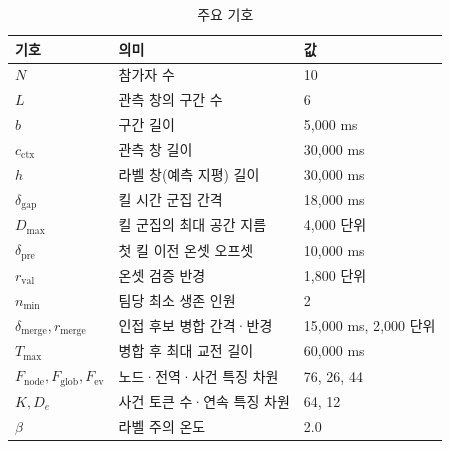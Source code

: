 \begin{table}[H]
  \centering
  \caption{주요 기호}
  \label{tab:notation}
  \small
  \begin{tabular}{@{}lll@{}}
    \toprule
    기호 & 의미 & 값 \\
    \midrule
    $N$ & 참가자 수 & 10 \\
    $L$ & 관측 창의 구간 수 & 6 \\
    $b$ & 구간 길이 & 5{,}000 ms \\
    $c_{\mathrm{ctx}}$ & 관측 창 길이 & 30{,}000 ms \\
    $h$ & 라벨 창(예측 지평) 길이 & 30{,}000 ms \\
    $\delta_{\mathrm{gap}}$ & 킬 시간 군집 간격 & 18{,}000 ms \\
    $D_{\max}$ & 킬 군집의 최대 공간 지름 & 4{,}000 단위 \\
    $\delta_{\mathrm{pre}}$ & 첫 킬 이전 온셋 오프셋 & 10{,}000 ms \\
    $r_{\mathrm{val}}$ & 온셋 검증 반경 & 1{,}800 단위 \\
    $n_{\min}$ & 팀당 최소 생존 인원 & 2 \\
    $\delta_{\mathrm{merge}}, r_{\mathrm{merge}}$ & 인접 후보 병합 간격·반경 & 15{,}000 ms, 2{,}000 단위 \\
    $T_{\max}$ & 병합 후 최대 교전 길이 & 60{,}000 ms \\
    $F_{\mathrm{node}}, F_{\mathrm{glob}}, F_{\mathrm{ev}}$ & 노드·전역·사건 특징 차원 & 76, 26, 44 \\
    $K, D_e$ & 사건 토큰 수·연속 특징 차원 & 64, 12 \\
    $\beta$ & 라벨 주의 온도 & 2.0 \\
    \bottomrule
  \end{tabular}
\end{table}
